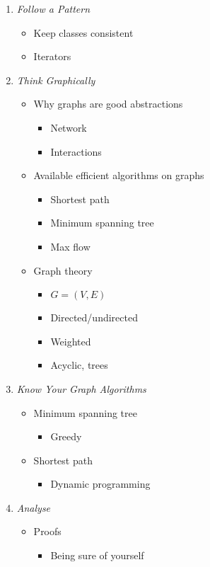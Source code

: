 \documentclass{article}
\begin{document}
\begin{enumerate}
\item \emph{Follow a Pattern}
  \begin{itemize}
  \item Keep classes consistent
  \item Iterators
  \end{itemize}
\item \emph{Think Graphically}
  \begin{itemize}
  \item Why graphs are good abstractions
    \begin{itemize}
    \item Network
    \item Interactions
    \end{itemize}
  \item Available efficient algorithms on graphs
    \begin{itemize}
    \item Shortest path
    \item Minimum spanning tree
    \item Max flow
    \end{itemize}
  \item Graph theory
    \begin{itemize}
    \item $G=(V,E)$
    \item Directed/undirected
    \item Weighted
    \item Acyclic, trees
    \end{itemize}
  \end{itemize}
\item \emph{Know Your Graph Algorithms}
  \begin{itemize}
  \item Minimum spanning tree
    \begin{itemize}
    \item Greedy
    \end{itemize}
  \item Shortest path
    \begin{itemize}
    \item Dynamic programming
    \end{itemize}
  \end{itemize}
\item \emph{Analyse}
  \begin{itemize}
  \item Proofs
    \begin{itemize}
    \item Being sure of yourself

\end{itemize}
\end{itemize}
\end{enumerate}
\end{document}
